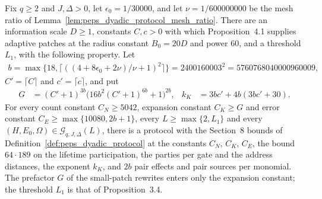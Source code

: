 \begin{lemma}
    \label{thm:peps_dyadic_protocol_explicit_constants}
    \leanok
    Fix $q\ge2$ and $J,\Delta>0$, let $\epsilon_0=1/30000$, and let
    $\nu=1/600000000$ be the mesh ratio of
    Lemma~\ref{lem:peps_dyadic_protocol_mesh_ratio}. There are an information
    scale $D\ge1$, constants $C,c>0$ with which Proposition~4.1 supplies
    adaptive patches at the radius constant $B_0=20D$ and power $60$, and a
    threshold $L_1$, with the following property. Let
    \begin{align}
        b=\max\{18,\lceil((4+8\epsilon_0+2\nu)/\nu+1)^2\rceil\}
        =2400160003^2=5760768040000960009,
    \end{align}
    $C'=\lceil C\rceil$ and $c'=\lceil c\rceil$, and put
    \begin{align}
        G   & =(C'+1)^{3b}\bigl(16b^2(C'+1)^{6b}+1\bigr)^{2b}, &
        k_K & =3bc'+4b(3bc'+30).
    \end{align}
    For every count constant $C_N\ge5042$, expansion constant $C_K\ge G$ and
    error constant $C_E\ge\max\{10080,2b+1\}$, every $L\ge\max\{2,L_1\}$ and
    every $(H,E_0,\Omega)\in\mathcal G_{q,J,\Delta}(L)$, there is a protocol with
    the Section~8 bounds of Definition~\ref{def:peps_dyadic_protocol} at the
    constants $C_N$, $C_K$, $C_E$, the bound $64\cdot189$ on the lifetime
    participation, the parties per gate and the address distances, the exponent
    $k_K$, and $2b$ pair effects and pair sources per monomial. The prefactor $G$
    of the small-patch rewrites enters only the expansion constant; the
    threshold $L_1$ is that of Proposition~3.4.
\end{lemma}

